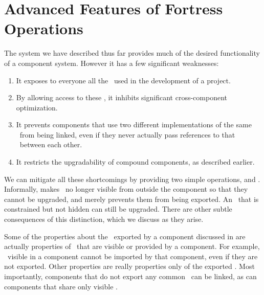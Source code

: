 %
%
%
%

 \section{Advanced Features of Fortress Operations}

The system we have described thus far
provides much of the desired functionality of a component system.
However it has a few significant weaknesses:
\begin{enumerate}

\item
It exposes to everyone all the \apisN\ used
in the development of a project.

\item
By allowing access to these \apisN,
it inhibits significant cross-component optimization.

\item
It prevents components that use two different implementations of the same
\apiN\ from being linked,
even if they never actually pass references to that \apiN\
between each other.

\item
It restricts the upgradability of compound components,
as described earlier.

\end{enumerate}

We can mitigate all these shortcomings
by providing two simple operations,
 and .
Informally,
 makes \apisN\ no longer visible from outside the component
so that they cannot be upgraded,
and  merely prevents them from being exported.
An \apiN\ that is constrained but not hidden
can still be upgraded.
There are other subtle consequences of this distinction,
which we discuss as they arise.

Some of the properties about the \apisN\ exported by a component
discussed in \secref{basicops}
are actually properties of \apisN\ that are visible or provided by a component.
For example,
\apisN\ visible in a component cannot be imported by that component,
even if they are not exported.
Other properties are really properties only of the exported \apisN.
Most importantly,
components that do not export any common \apisN\ can be linked,
as can components that share only visible \apisN.

